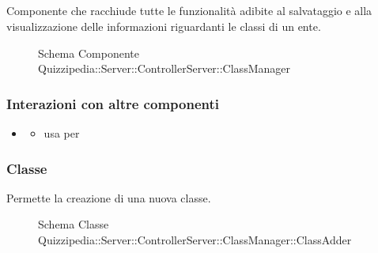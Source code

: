 \subsection{}
Componente che racchiude tutte le funzionalità adibite al salvataggio e alla visualizzazione delle informazioni riguardanti le classi di un ente.
\begin{figure}[H]
\centering
\noindent{}
\caption[Schema Componente Quizzipedia::Server::ControllerServer::ClassManager]{Schema Componente Quizzipedia::Server::ControllerServer::ClassManager}
\end{figure}
\subsubsection{Interazioni con altre componenti}
\begin{itemize}
\item {}
\begin{itemize}
\item usa  per 
\end{itemize}
\end{itemize}
\subsubsection{Classe }
Permette la creazione di una nuova classe.
\begin{figure}[H]
\centering
\noindent{}
\caption[Schema Classe ClassAdder]{Schema Classe Quizzipedia::Server::ControllerServer::ClassManager::ClassAdder}
\end{figure}
